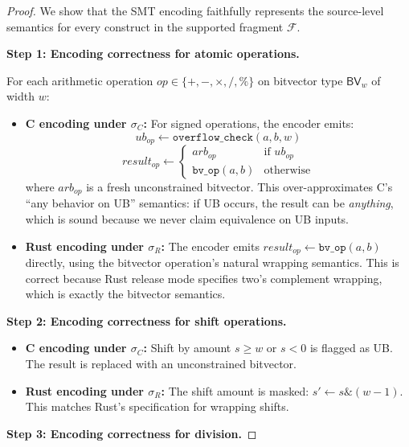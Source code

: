 \documentclass[11pt]{article}
\begin{document}
\begin{proof}
We show that the SMT encoding faithfully represents the source-level
semantics for every construct in the supported fragment $\mathcal{F}$.

\medskip\noindent\textbf{Step 1: Encoding correctness for atomic operations.}

For each arithmetic operation $\mathit{op} \in \{+, -, \times, /, \%\}$ on
bitvector type $\textsf{BV}_w$ of width $w$:

\begin{itemize}[nosep]
\item \textbf{C encoding under $\sigma_C$:}
  For signed operations, the encoder emits:
  \[
    \mathit{ub}_\mathit{op} \leftarrow \texttt{overflow\_check}(a, b, w)
  \]
  \[
    \mathit{result}_\mathit{op} \leftarrow
    \begin{cases}
      \mathit{arb}_\mathit{op} & \text{if } \mathit{ub}_\mathit{op} \\
      \texttt{bv\_op}(a, b) & \text{otherwise}
    \end{cases}
  \]
  where $\mathit{arb}_\mathit{op}$ is a fresh unconstrained bitvector.
  This over-approximates C's ``any behavior on UB'' semantics: if UB
  occurs, the result can be \emph{anything}, which is sound because
  we never claim equivalence on UB inputs.

\item \textbf{Rust encoding under $\sigma_R$:}
  The encoder emits $\mathit{result}_\mathit{op} \leftarrow \texttt{bv\_op}(a, b)$
  directly, using the bitvector operation's natural wrapping semantics.
  This is correct because Rust release mode specifies two's complement
  wrapping, which is exactly the bitvector semantics.
\end{itemize}

\medskip\noindent\textbf{Step 2: Encoding correctness for shift operations.}

\begin{itemize}[nosep]
\item \textbf{C encoding under $\sigma_C$:}
  Shift by amount $s \geq w$ or $s < 0$ is flagged as UB.  The result is
  replaced with an unconstrained bitvector.

\item \textbf{Rust encoding under $\sigma_R$:}
  The shift amount is masked: $s' \leftarrow s \mathbin{\&} (w-1)$.
  This matches Rust's specification for wrapping shifts.
\end{itemize}

\medskip\noindent\textbf{Step 3: Encoding correctness for division.}


\end{proof}
\end{document}
